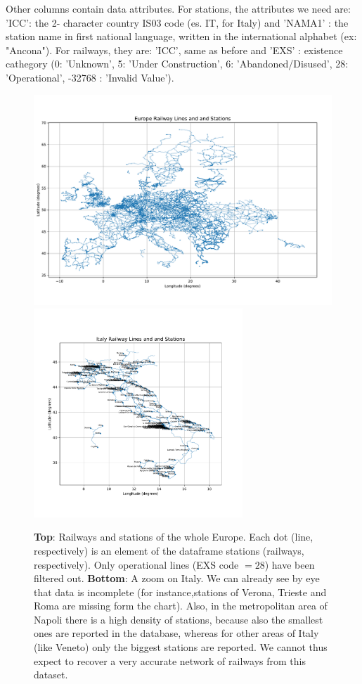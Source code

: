 Other columns contain data attributes. For stations, the attributes we need are: 'ICC': the 2- character country IS03 code (es. IT, for Italy) and 'NAMA1' : the station name in first national language, written in the international alphabet (ex: "Ancona"). 
For railways, they are: 'ICC', same as before and 'EXS' : existence cathegory (0: 'Unknown', 5: 'Under Construction', 6: 'Abandoned/Disused', 28: 'Operational', -32768 : 'Invalid Value').
\begin{figure}[H]
    \centering
    \includegraphics[width = 0.8 \textwidth]{latex_source/images/railways/europe.pdf}
    \includegraphics[width = 0.7\textwidth]{latex_source/images/railways/italy.pdf}
    \caption{\textbf{Top}: Railways and stations of the whole Europe. Each dot (line, respectively) is an element of the dataframe stations (railways, respectively). Only operational lines (EXS code $= 28$) have been filtered out. \textbf{Bottom}: A zoom on Italy. We can already see by eye that data is incomplete (for instance,stations of Verona, Trieste and Roma are missing form the chart). Also, in the metropolitan area of Napoli there is a high density of stations, because also the smallest ones are reported in the database, whereas for other areas of Italy (like Veneto) only the biggest stations are reported. We cannot thus expect to recover a very accurate network of railways from this dataset.}
\end{figure}

